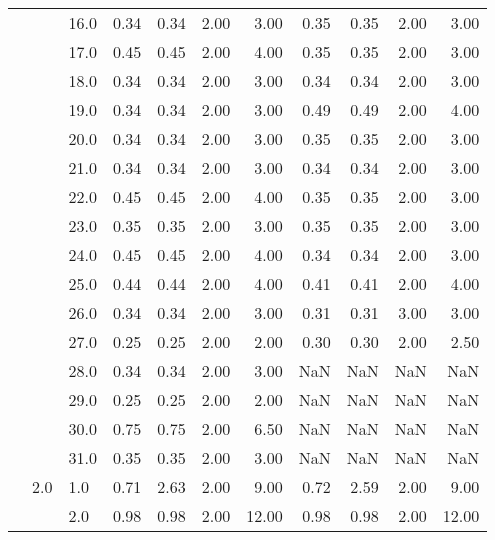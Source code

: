 \begin{tabular}{lllrrrrrrrr}
       &     & 16.0 &       0.34 &      0.34 & 2.00 &   3.00 &       0.35 &      0.35 & 2.00 &   3.00 \\
       &     & 17.0 &       0.45 &      0.45 & 2.00 &   4.00 &       0.35 &      0.35 & 2.00 &   3.00 \\
       &     & 18.0 &       0.34 &      0.34 & 2.00 &   3.00 &       0.34 &      0.34 & 2.00 &   3.00 \\
       &     & 19.0 &       0.34 &      0.34 & 2.00 &   3.00 &       0.49 &      0.49 & 2.00 &   4.00 \\
       &     & 20.0 &       0.34 &      0.34 & 2.00 &   3.00 &       0.35 &      0.35 & 2.00 &   3.00 \\
       &     & 21.0 &       0.34 &      0.34 & 2.00 &   3.00 &       0.34 &      0.34 & 2.00 &   3.00 \\
       &     & 22.0 &       0.45 &      0.45 & 2.00 &   4.00 &       0.35 &      0.35 & 2.00 &   3.00 \\
       &     & 23.0 &       0.35 &      0.35 & 2.00 &   3.00 &       0.35 &      0.35 & 2.00 &   3.00 \\
       &     & 24.0 &       0.45 &      0.45 & 2.00 &   4.00 &       0.34 &      0.34 & 2.00 &   3.00 \\
       &     & 25.0 &       0.44 &      0.44 & 2.00 &   4.00 &       0.41 &      0.41 & 2.00 &   4.00 \\
       &     & 26.0 &       0.34 &      0.34 & 2.00 &   3.00 &       0.31 &      0.31 & 3.00 &   3.00 \\
       &     & 27.0 &       0.25 &      0.25 & 2.00 &   2.00 &       0.30 &      0.30 & 2.00 &   2.50 \\
       &     & 28.0 &       0.34 &      0.34 & 2.00 &   3.00 &        NaN &       NaN &  NaN &    NaN \\
       &     & 29.0 &       0.25 &      0.25 & 2.00 &   2.00 &        NaN &       NaN &  NaN &    NaN \\
       &     & 30.0 &       0.75 &      0.75 & 2.00 &   6.50 &        NaN &       NaN &  NaN &    NaN \\
       &     & 31.0 &       0.35 &      0.35 & 2.00 &   3.00 &        NaN &       NaN &  NaN &    NaN \\
       & 2.0 & 1.0  &       0.71 &      2.63 & 2.00 &   9.00 &       0.72 &      2.59 & 2.00 &   9.00 \\
       &     & 2.0  &       0.98 &      0.98 & 2.00 &  12.00 &       0.98 &      0.98 & 2.00 &  12.00 \\

\end{tabular}
